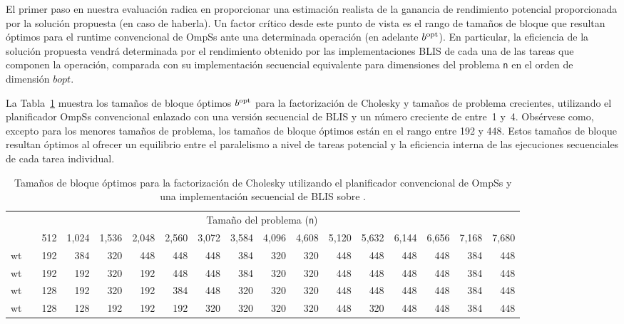 \newcommand{\bopt}{b^{\mbox{\rm \scriptsize opt}}\xspace}

El primer paso en nuestra evaluación radica en proporcionar una estimación realista de la ganancia de rendimiento
potencial proporcionada por la solución propuesta (en caso de haberla). Un factor crítico desde este punto de vista es
el rango de tamaños de bloque que resultan óptimos para el runtime convencional de OmpSs ante una determinada operación
(en adelante $\bopt$). En particular, la eficiencia de la solución propuesta vendrá determinada por el rendimiento obtenido
por las implementaciones BLIS de cada una de las tareas que componen la operación, comparada con su implementación secuencial
equivalente para dimensiones del problema {\tt n} en el orden de dimensión $bopt$.

La Tabla~\ref{tab:optimal_bs_sym} muestra los tamaños de bloque óptimos $\bopt$ para la factorización de Cholesky y tamaños
de problema crecientes, utilizando el planificador OmpSs convencional enlazado con una versión secuencial de BLIS y un número
creciente de \wts entre~1 y~4. Obsérvese como, excepto para los menores tamaños de problema, los tamaños de bloque óptimos están
en el rango entre 192 y 448. Estos tamaños de bloque resultan óptimos al ofrecer un equilibrio entre el paralelismo a nivel de tareas
potencial y la eficiencia interna de las ejecuciones secuenciales de cada tarea individual.

\newcommand{\ra}[1]{\renewcommand{\arraystretch}{#1}}
\newcommand{\ca}[1]{\renewcommand{\tabcolsep}{#1}}

\ra{1.2}
\ca{2pt}

\begin{table}
	\centering
	\caption{Tamaños de bloque óptimos para la factorización de Cholesky utilizando el planificador convencional
	         de OmpSs y una implementación secuencial de BLIS sobre \odroid.}
	\label{tab:optimal_bs_sym}
{\scriptsize
\begin{tabular}{crrrrrrrrrrrrrrrr} 
\toprule
  & \phantom{a} & \multicolumn{14}{c}{Tamaño del problema ({\tt n})} \\ 
\cmidrule{3-17} 
  & \phantom{a} &     512 & 1,024 & 1,536 & 2,048 & 2,560 & 3,072 & 3,584 & 4,096 & 4,608 & 5,120 & 5,632 & 6,144 & 6,656 & 7,168 & 7,680 \\ \hline

{\sc 1 wt} & \phantom{a} &     192 & 384  & 320  & 448  & 448  & 448  & 384  & 320 & 320 & 448 & 448 & 448 & 448 & 384 & 448 \\ \hline
{\sc 2 wt} & \phantom{a} &     192 & 192  & 320  & 192  & 448  & 448  & 384  & 320 & 320 & 448 & 448 & 448 & 448 & 384 & 448 \\ \hline
{\sc 3 wt} & \phantom{a} &     128 & 192  & 320  & 192  & 384  & 448  & 320  & 320 & 320 & 448 & 448 & 448 & 448 & 384 & 448 \\ \hline
{\sc 4 wt} & \phantom{a} &     128 & 128  & 192  & 192  & 192  & 320  & 320  & 320 & 320 & 448 & 320 & 448 & 448 & 384 & 448 \\ \bottomrule
\end{tabular}
}
\end{table}

